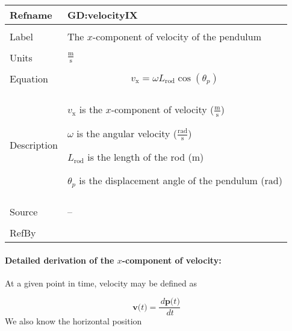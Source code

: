 \documentclass[12pt]{article}
\begin{document}
\vspace{\baselineskip}
\noindent
\begin{minipage}{\textwidth}
\begin{tabular}{>{\raggedright}p{}>{\raggedright\arraybackslash}p{}}
\toprule \textbf{Refname} & \textbf{GD:velocityIX}
\label{GD:velocityIX}
\\ \midrule \\
Label & The $x$-component of velocity of the pendulum
        
\\ \midrule \\
Units & $\frac{\text{m}}{\text{s}}$
        
\\ \midrule \\
Equation & \begin{displaymath}
           {v_{\text{x}}}=ω {L_{\text{rod}}} \cos\left({θ_{p}}\right)
           \end{displaymath}
\\ \midrule \\
Description & \begin{symbDescription}
              \item{${v_{\text{x}}}$ is the $x$-component of velocity ($\frac{\text{m}}{\text{s}}$)}
              \item{$ω$ is the angular velocity ($\frac{\text{rad}}{\text{s}}$)}
              \item{${L_{\text{rod}}}$ is the length of the rod (${\text{m}}$)}
              \item{${θ_{p}}$ is the displacement angle of the pendulum (${\text{rad}}$)}
              \end{symbDescription}
\\ \midrule \\
Source & --
         
\\ \midrule \\
RefBy & 
\\ \bottomrule
\end{tabular}
\end{minipage}
\paragraph{Detailed derivation of the $x$-component of velocity:}
\label{GD:velocityIXDeriv}
At a given point in time, velocity may be defined as

\begin{displaymath}
\symbf{v}\text{(}t\text{)}=\frac{\,d\symbf{p}\text{(}t\text{)}}{\,dt}
\end{displaymath}
We also know the horizontal position
\end{document}
